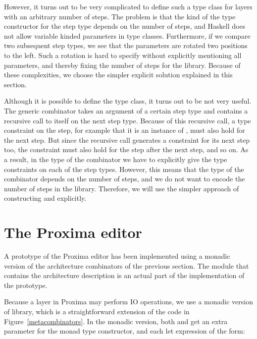 \documentclass[preprint,natbib]{sigplanconf}
\begin{document}
However, it turns out to be very complicated to define such a type class for layers with an arbitrary number of steps. The problem is that the kind of the type constructor for the step type depends on the number of steps, and Haskell does not allow variable kinded parameters in type classes. Furthermore, if we compare two subsequent step types, we see that the parameters are rotated two positions to the left. Such a rotation is hard to specify without explicitly mentioning all parameters, and thereby fixing the number of steps for the library. Because of these complexities, we choose the simpler explicit solution explained in this section.


\bc Although it is possible to define the type class, it turns out to be not very useful. The generic combinator takes an argument of a certain step type and contains a recursive call to itself on the next step type. Because of this recursive call, a type constraint on the step, for example that it is an instance of , must also hold for the next step. But since the recursive call generates a constraint for its next step too, the constraint must also hold for the step after the next step, and so on. As a result, in the type of the combinator we have to explicitly give the type constraints on each of the step types. However, this means that the type of the combinator depends on the number of steps, and we do not want to encode the number of steps in the library. Therefore, we will use the simpler approach of constructing  and  explicitly. \ec






%																
%																
%																
\section{The Proxima editor} \label{sect:proxima}


A prototype of the Proxima editor has been implemented using a monadic version of the architecture combinators of the previous section. The module that contains the architecture description is an actual part of the implementation of the prototype.


Because a layer in Proxima may perform IO operations, we use a monadic version of library, which is a straightforward extension of the code in Figure~\ref{metacombinators}. In the monadic version, both  and  get an extra parameter  for the monad type constructor, and each let expression of the  form:
\end{document}
